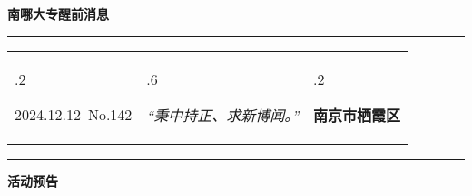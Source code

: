 \documentclass[letterpaper, 12pt]{article}
\begin{document}
\begin{center}
    \Huge\textbf{南哪大专醒前消息}
\end{center}
\vspace{4mm}
\hrule
\renewcommand\tabularxcolumn[1]{m{#1}}
\begin{tabularx}{\textwidth}{>{\hsize.2\hsize}X>{\hsize.6\hsize}X>{\hsize.2\hsize}X}
    \begin{flushleft}
        2024.12.12\, No.142
    \end{flushleft}
    &
    \begin{center}
        \textit{“秉中持正、求新博闻。”}
    \end{center}
    &
    \begin{flushright}
        \textbf{南京市栖霞区}
    \end{flushright}
\end{tabularx}
\vspace{-3.5mm}
\hrule
\vspace{4mm}
\centerline{\huge\textbf{活动预告}}
\end{document}
